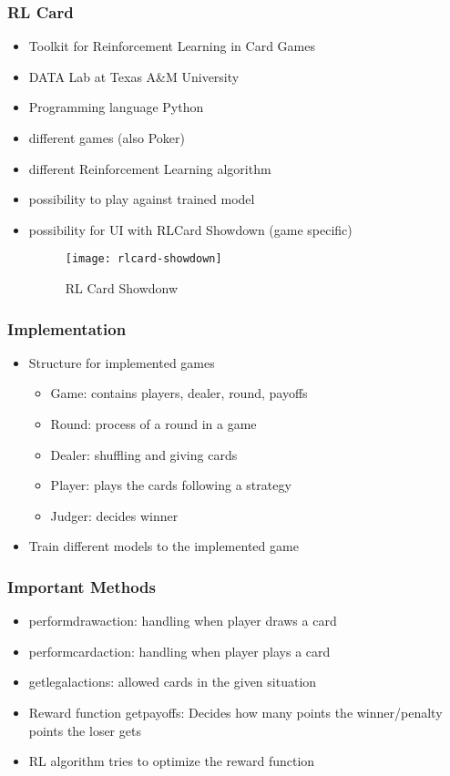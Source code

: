 \begin{frame}
    \frametitle{RL Card}
    \begin{itemize}
        \item Toolkit for Reinforcement Learning in Card Games
        \item DATA Lab at Texas A\&M University
        \item Programming language Python
        \item different games (also Poker)
        \item different Reinforcement Learning algorithm
        \item possibility to play against trained model
        \item possibility for UI with RLCard Showdown (game specific)
        \begin{figure}
                  \texttt{[image: rlcard-showdown]}
                  \caption{RL Card Showdonw}
        \end{figure}
    \end{itemize}
\end{frame}


\begin{frame}
    \frametitle{Implementation}
    \begin{itemize}
        \item Structure for implemented games
        \begin{itemize}
            \item Game: contains players, dealer, round, payoffs
            \item Round: process of a round in a game
            \item Dealer: shuffling and giving cards
            \item Player: plays the cards following a strategy
            \item Judger: decides winner
        \end{itemize}
        \item Train different models to the implemented game
    \end{itemize}
\end{frame}


\begin{frame}
    \frametitle{Important Methods}
    \begin{itemize}
        \item perform\textunderscore draw\textunderscore action: handling when player draws a card
        \item perform\textunderscore card\textunderscore action: handling when player plays a card
        \item get\textunderscore legal\textunderscore actions: allowed cards in the given situation
        \item Reward function get\textunderscore payoffs: Decides how many points the winner/penalty points the loser gets
        \item RL algorithm tries to optimize the reward function
    \end{itemize}
\end{frame}
